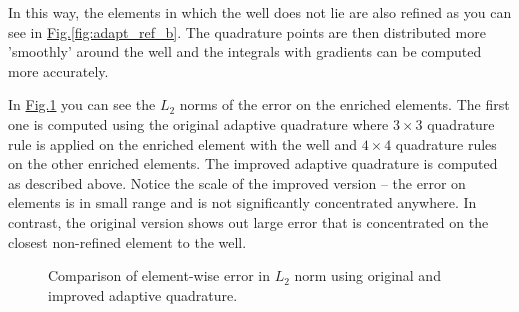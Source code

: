 \documentclass[preprint,12pt]{elsarticle}
\newcommand{\fig}[1]{\hyperref[#1]{Fig.\ref{#1}}}
\newcommand{\notePE}[1]{{\color{Orange} \textbf{PE: } \textit{#1}}}
\begin{document}
In this way, the elements in which the well does not lie are also refined as you can see in 
\fig{fig:adapt_ref_b}. The quadrature points are then distributed more 'smoothly' around the well and the
integrals with gradients can be computed more accurately. 


In \fig{fig:adapt_refinement_norm} you can see the $L_2$ norms of the error on the enriched elements.
The first one is computed using the original adaptive quadrature where $3\times3$ quadrature rule is applied 
on the enriched element with the well and $4\times4$ quadrature rules on the other enriched elements. 
The improved adaptive quadrature is computed as described above. Notice the scale of the improved version -- 
the error on elements is in small range and is not significantly concentrated anywhere. In contrast, 
the original version shows out large error that is concentrated on the closest non-refined element to the well.

\begin{figure}[!htb]
  \centering    
  \hspace{0pt}
  \caption[Adaptive quadrature refinement comparison]
  {Comparison of element-wise error in $L_2$ norm using original and improved adaptive quadrature.
  }
  \label{fig:adapt_refinement_norm}
\end{figure}
\end{document}
